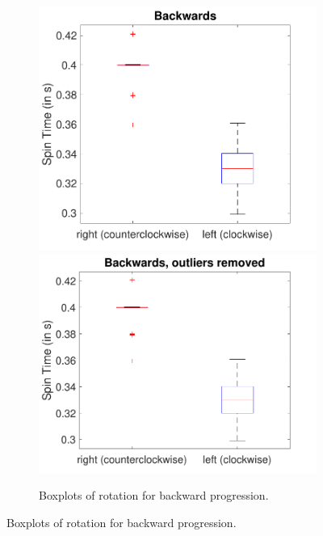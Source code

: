\documentclass[a4paper,twoside]{book}
\begin{document}
\begin{figure}[h]
\begin{subfigure}[t]{0.5\textwidth}
  \includegraphics[width=\textwidth, center]{img/backwards} 
  \includegraphics[width=\textwidth, center]{img/backwards_2}
  \caption{Boxplots of rotation for backward progression.}
  \end{subfigure}
\end{figure}
\end{document}
